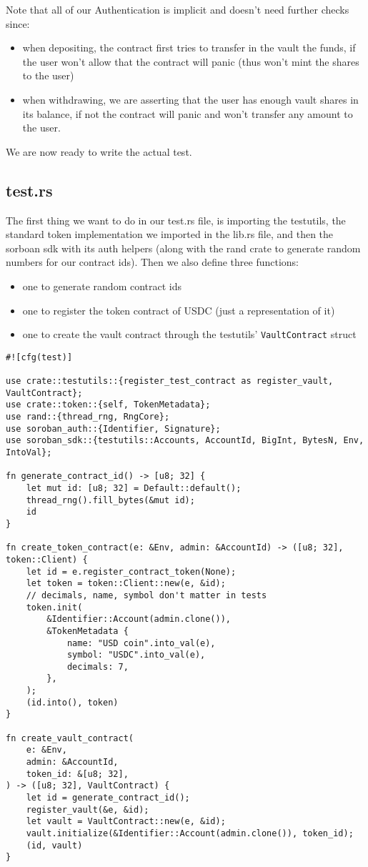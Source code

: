 \documentclass{article}
\newcommand{\inl}[1]{\lstinline{#1}}
\begin{document}
Note that all of our Authentication is implicit and doesn't need further checks since:

\begin{itemize}
\item when depositing, the contract first tries to transfer in the vault the funds, if the user won't allow that the contract will panic (thus won't mint the shares to the user)
\item when withdrawing, we are asserting that the user has enough vault shares in its balance, if not the contract will panic and won't transfer any amount to the user. 
\end{itemize}

We are now ready to write the actual test.

\subsection{test.rs}
The first thing we want to do in our test.rs file, is importing the testutils, the standard token implementation we imported in the lib.rs file, and then the sorboan sdk with its auth helpers (along with the rand crate to generate random numbers for our contract ids). Then we also define three functions:

\begin{itemize}
\item one to generate random contract ids
\item one to register the token contract of USDC (just a representation of it)
\item one to create the vault contract through the testutils' \inl{VaultContract} struct
\end{itemize}

\begin{lstlisting}
#![cfg(test)]

use crate::testutils::{register_test_contract as register_vault, VaultContract};
use crate::token::{self, TokenMetadata};
use rand::{thread_rng, RngCore};
use soroban_auth::{Identifier, Signature};
use soroban_sdk::{testutils::Accounts, AccountId, BigInt, BytesN, Env, IntoVal};

fn generate_contract_id() -> [u8; 32] {
    let mut id: [u8; 32] = Default::default();
    thread_rng().fill_bytes(&mut id);
    id
}

fn create_token_contract(e: &Env, admin: &AccountId) -> ([u8; 32], token::Client) {
    let id = e.register_contract_token(None);
    let token = token::Client::new(e, &id);
    // decimals, name, symbol don't matter in tests
    token.init(
        &Identifier::Account(admin.clone()),
        &TokenMetadata {
            name: "USD coin".into_val(e),
            symbol: "USDC".into_val(e),
            decimals: 7,
        },
    );
    (id.into(), token)
}

fn create_vault_contract(
    e: &Env,
    admin: &AccountId,
    token_id: &[u8; 32],
) -> ([u8; 32], VaultContract) {
    let id = generate_contract_id();
    register_vault(&e, &id);
    let vault = VaultContract::new(e, &id);
    vault.initialize(&Identifier::Account(admin.clone()), token_id);
    (id, vault)
}
\end{lstlisting}
\end{document}
